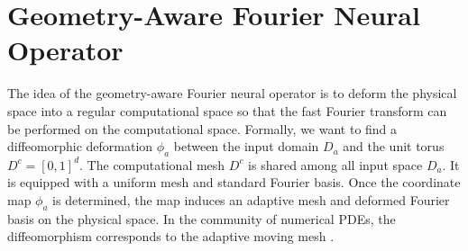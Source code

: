 \documentclass{article}
\begin{document}


\section{Geometry-Aware Fourier Neural Operator }
The idea of the geometry-aware Fourier neural operator is to deform the physical space into a regular computational space so that the fast Fourier transform can be performed on the computational space. 
Formally, we want to find a diffeomorphic deformation $\phi_a$ between the input domain $D_a$ and the unit torus $D^c = [0,1]^d$. 
The computational mesh $D^c$ is shared among all input space $D_a$. It is equipped with a uniform mesh and standard Fourier basis. Once the coordinate map $\phi_a$ is determined, the map induces an adaptive mesh and deformed Fourier basis on the physical space. In the community of numerical PDEs, the diffeomorphism corresponds to the adaptive moving mesh \citep{huang2010adaptive}. 
\end{document}
